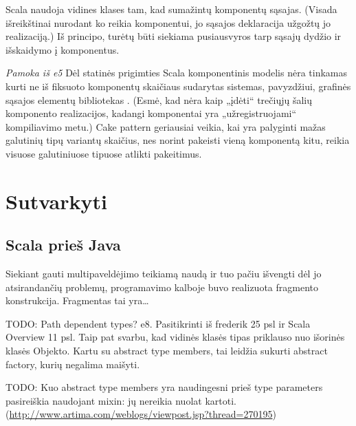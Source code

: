 Scala naudoja vidines klases tam, kad sumažintų komponentų
sąsajas.\cite[13]{scalable-component-abstractions}
(Visada išreikštinai nurodant ko reikia komponentui, jo sąsajos
deklaracija užgožtų jo realizaciją.) Iš principo, turėtų būti
siekiama pusiausvyros tarp sąsajų dydžio ir išskaidymo į komponentus.

\emph{Pamoka iš e5} Dėl statinės prigimties Scala komponentinis
modelis nėra tinkamas kurti ne iš fiksuoto komponentų skaičiaus
sudarytas sistemas, pavyzdžiui, grafinės sąsajos elementų bibliotekas
. (Esmė, kad nėra kaip „įdėti“ trečiųjų šalių
komponento realizacijos, kadangi komponentai yra „užregistruojami“
kompiliavimo metu.) Cake pattern geriausiai veikia, kai
yra palyginti mažas galutinių tipų variantų skaičius, nes norint
pakeisti vieną komponentą kitu, reikia visuose galutiniuose tipuose
atlikti pakeitimus.

\section{Sutvarkyti}

\subsection{Scala prieš Java}

Siekiant gauti multipaveldėjimo teikiamą naudą ir tuo pačiu išvengti
dėl jo atsirandančių problemų,  programavimo
kalboje buvo realizuota fragmento  konstrukcija.
Fragmentas tai yra…

TODO: Path dependent types? e8. Pasitikrinti iš frederik 25 psl ir
Scala Overview 11 psl. Taip pat svarbu, kad vidinės klasės tipas
priklauso nuo išorinės klasės Objekto. Kartu su abstract type
members, tai leidžia sukurti abstract factory, kurių negalima
maišyti.

TODO: Kuo abstract type members yra naudingesni prieš type parameters
pasireiškia naudojant mixin: jų nereikia nuolat kartoti.
(\url{http://www.artima.com/weblogs/viewpost.jsp?thread=270195})

